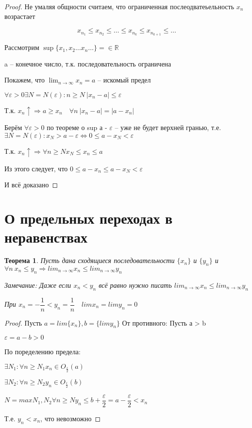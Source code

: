 \documentclass{book}
\newtheorem{Th}{Теорема}[chapter]
\begin{document}
\begin{proof}
Не умаляя общности считаем, что ограниченная послеодватеьельность $x_n$ возрастает

$$x_{n_1}\leqslant x_{n_2}\leqslant \hdots\leqslant x_{n_k}\leqslant x_{n_{k+1}}\leqslant \hdots$$

Рассмотрим $\sup\{x_1, x_2 \hdots x_n \hdots\} = \in \mathds{R}$

a -- конечное число, т.к. последовательность ограничена

Покажем, что $\lim_{n\rightarrow \infty} x_n = a$ -- искомый предел

$\forall \varepsilon >0 \exists N = N(\varepsilon): n \geqslant N ~ |x_n-a|\leqslant \varepsilon$

Т.к. $x_n \uparrow \Rightarrow a \geqslant x_n \quad \forall n ~|x_n-a| = |a - x_n|$

Берём $\forall \varepsilon >0$ по теореме о sup а - $\varepsilon$ -- уже не будет верхней гранью, т.е. $\exists N = N(\varepsilon): x_N > a - \varepsilon \Leftrightarrow 0 \leqslant a-x_N<\varepsilon$

Т.к. $x_n \uparrow \Rightarrow \forall n \geqslant N x_N\leqslant x_n\leqslant a$

Из этого следует, что $0\leqslant a - x_n \leqslant a - x_N < \varepsilon$

И всё доказано
\end{proof} 


\section*{О предельных переходах в неравенствах}

\begin{Th}
	Пусть дана сходящиеся последовательности $\{x_n\}$ и $\{y_n\}$ и $\forall n ~x_n \leqslant y_n \Rightarrow lim_{n \rightarrow \infty}x_n \leqslant lim_{n \rightarrow \infty} y_n$
	
	Замечание:
	Даже если $x_n < y_n$ всё равно нужно писать $lim_{n \rightarrow \infty}x_n \leqslant lim_{n \rightarrow \infty} y_n$
	
	При $x_n = -\dfrac{1}{n}< y_n = \dfrac{1}{n}\quad lim x_n = lim y_n = 0$	 
\end{Th}

\begin{proof}
	Пусть $a = lim \{x_n\}, b = \{lim y_n\}$
	От противного: Пусть а > b 
	
	$\varepsilon = a - b >0$
	
	По поределению предела:
	
	$\exists N_1 : \forall n \geqslant N_1 x_n \in O_{\frac{\varepsilon}{2}}(a)$
	
	$\exists N_2 : \forall n \geqslant N_2 y_n \in O_{\frac{\varepsilon}{2}}(b)$
	
	$N = max{N_1, N_2} \forall n \geqslant N y_n\leqslant b + \dfrac{\varepsilon}{2} = a-\dfrac{\varepsilon}{2}<x_n$
	
	Т.е. $y_n < x_n$, что невозможно	
\end{proof}
\end{document}
